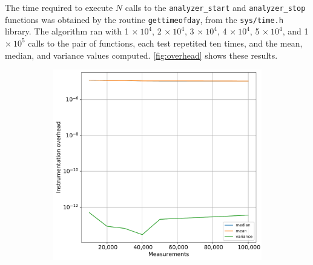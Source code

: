 The time required to execute $N$ %
calls to the {\tt analyzer\_start} and {\tt analyzer\_stop} functions was obtained by the routine {\tt gettimeofday}, from the {\tt sys/time.h} library. The algorithm ran with 1 %
$\times~10^{4}$, 2 $\times~10^{4}$, 3 $\times~10^{4}$, 4 $\times~10^{4}$, 5 $\times~10^{4}$, and 1 $\times~10^{5}$ calls to the pair of functions, each test repetited ten times, and the mean, median, and variance values computed. \cref{fig:overhead} shows these results.

\begin{figure}[H]
\centering
\captionsetup{justification=centering}
\begin{subfigure}[b]{0.45\textwidth}	
	\includegraphics[width=\textwidth]{pascalanalyzer/figures/designfeatures/instrumentation_overhead_summary.pdf}
	\label{fig:overhead_1}
\end{subfigure}
%
\begin{subfigure}[b]{0.46\textwidth}

\end{subfigure}
\end{figure}
